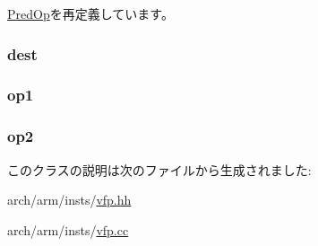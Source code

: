 \hyperlink{classArmISA_1_1PredOp_a273dc0fe84de8f4a9cf52aaf8dc27885}{PredOp}を再定義しています。\hypertarget{classArmISA_1_1FpCondSelOp_aec72e8e45bdc87abeeeb75d2a8a9a716}{
\subsubsection[{dest}]{ {\bf dest}}}
\label{classArmISA_1_1FpCondSelOp_aec72e8e45bdc87abeeeb75d2a8a9a716}
\hypertarget{classArmISA_1_1FpCondSelOp_a4c465c43ad568f8bcf8ae71480e9cfea}{
\subsubsection[{op1}]{ {\bf op1}}}
\label{classArmISA_1_1FpCondSelOp_a4c465c43ad568f8bcf8ae71480e9cfea}
\hypertarget{classArmISA_1_1FpCondSelOp_a7799ff6cbe5a252199059eb8665820e7}{
\subsubsection[{op2}]{ {\bf op2}}}
\label{classArmISA_1_1FpCondSelOp_a7799ff6cbe5a252199059eb8665820e7}


このクラスの説明は次のファイルから生成されました:\begin{DoxyCompactItemize}
\item 
arch/arm/insts/\hyperlink{vfp_8hh}{vfp.hh}\item 
arch/arm/insts/\hyperlink{vfp_8cc}{vfp.cc}\end{DoxyCompactItemize}

